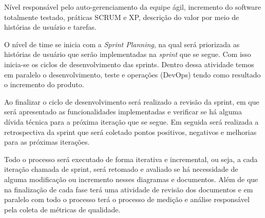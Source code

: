 Nível responsável pelo auto-gerenciamento da equipe ágil, incremento do software totalmente testado, práticas SCRUM e XP, descrição do valor por meio de histórias de usuário e tarefas.

O nível de time se inicia com a \textit{Sprint Planning}, na qual será priorizada as histórias de usuário que serão implementadas na \textit{sprint} que se segue. Com isso inicia-se os ciclos de desenvolvimento das sprints. Dentro dessa atividade temos em paralelo o desenvolvimento, teste e operações (DevOps) tendo como resultado o incremento do produto.

Ao finalizar o ciclo de desenvolvimento será realizado a revisão da sprint, em que será apresentado as funcionalidades implementadas e verificar se há alguma dívida técnica para a próxima iteração que se segue. Em seguida será realizada a retrospectiva da sprint que será coletado pontos positivos, negativos e melhorias para as próximas iterações.

Todo o processo será executado de forma iterativa e incremental, ou seja, a cada iteração chamada de sprint, será retomado e avaliado se há necessidade de alguma modificação ou incremento nesses diagramas e documentos. Além de que na finalização de cada fase terá uma atividade de revisão dos documentos e em paralelo com todo o processo terá o processo de medição e análise responsável pela coleta de métricas de qualidade.
